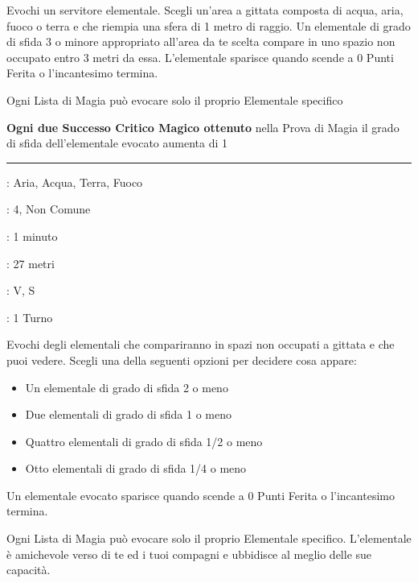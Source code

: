 \begin{multicols}{2}
Evochi un servitore elementale. Scegli un'area a gittata composta di acqua, aria, fuoco o terra e che riempia una sfera di 1 metro di raggio. Un elementale di grado di sfida 3 o minore appropriato all'area da te scelta compare in uno spazio non occupato entro 3 metri da essa. L'elementale sparisce quando scende a 0 Punti Ferita o l'incantesimo termina.

Ogni Lista di Magia può evocare solo il proprio Elementale specifico

\textbf{Ogni due Successo Critico Magico ottenuto} nella Prova di Magia il grado di sfida dell'elementale evocato aumenta di 1

\smallskip\noindent\rule{\linewidth}{2pt} \hypertarget{Evoca Elementali Minori}{}\smallskip{}
\noindent
\begin{description}[noitemsep, topsep=0pt, parsep=0pt, partopsep=0pt, leftmargin=0cm, labelwidth=2.8cm]
	\item[\textbf{Lista di Magia}]: Aria, Acqua, Terra, Fuoco
	\item[\textbf{Livello}]: 4, Non Comune
	\item[\textbf{T. di Lancio}]: 1 minuto
	\item[\textbf{Gittata}]: 27 metri
	\item[\textbf{Componenti}]: V, S
	\item[\textbf{Durata}]: 1 Turno
\end{description}

Evochi degli elementali che compariranno in spazi non occupati a gittata e che puoi vedere. Scegli una della seguenti opzioni per decidere cosa appare:

\begin{itemize}[leftmargin=*] \setlength{\itemsep}{-1pt}
	\item Un elementale di grado di sfida 2 o meno
	\item Due elementali di grado di sfida 1 o meno
	\item Quattro elementali di grado di sfida 1/2 o meno
	\item Otto elementali di grado di sfida 1/4 o meno
\end{itemize}

Un elementale evocato sparisce quando scende a 0 Punti Ferita o l'incantesimo termina.

Ogni Lista di Magia può evocare solo il proprio Elementale specifico. L'elementale è amichevole verso di te ed i tuoi compagni e ubbidisce al meglio delle sue capacità.


\end{multicols}
